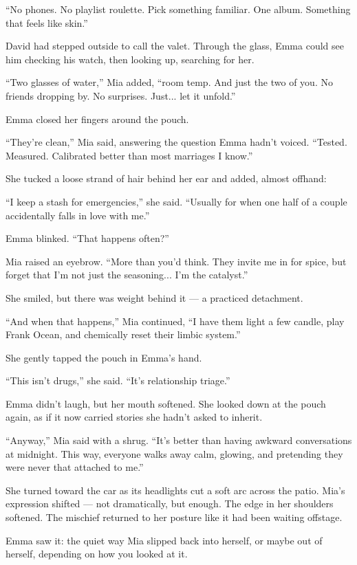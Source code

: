 ``No phones. No playlist roulette. Pick something familiar. One album. Something
that feels like skin.''

David had stepped outside to call the valet. Through the glass, Emma could see
him checking his watch, then looking up, searching for her.

``Two glasses of water,'' Mia added, ``room temp. And just the two of you. No
friends dropping by. No surprises. Just... let it unfold.''

Emma closed her fingers around the pouch.

``They’re clean,'' Mia said, answering the question Emma hadn’t voiced. ``Tested.
Measured. Calibrated better than most marriages I know.''

She tucked a loose strand of hair behind her ear and added, almost offhand:

``I keep a stash for emergencies,'' she said. ``Usually for when one half of a
couple accidentally falls in love with me.''

Emma blinked. ``That happens often?''

Mia raised an eyebrow. ``More than you'd think. They invite me in for spice,
but forget that I'm not just the seasoning... I'm the catalyst.''

She smiled, but there was weight behind it — a practiced detachment.

``And when that happens,'' Mia continued, ``I have them light a few candle, 
play Frank Ocean, and chemically reset their limbic system.''

She gently tapped the pouch in Emma’s hand.

``This isn’t drugs,'' she said. ``It’s relationship triage.''

Emma didn’t laugh, but her mouth softened. She looked down at the pouch again,
as if it now carried stories she hadn’t asked to inherit.

``Anyway,'' Mia said with a shrug. ``It's better than having awkward conversations 
at midnight. This way, everyone walks away calm, glowing, and pretending they were
never that attached to me.''

She turned toward the car as its headlights cut a soft arc across the patio.
Mia’s expression shifted — not dramatically, but enough.
The edge in her shoulders softened. The mischief returned to her posture like it had 
been waiting offstage.

Emma saw it: the quiet way Mia slipped back into herself, or maybe out of herself, 
depending on how you looked at it.

